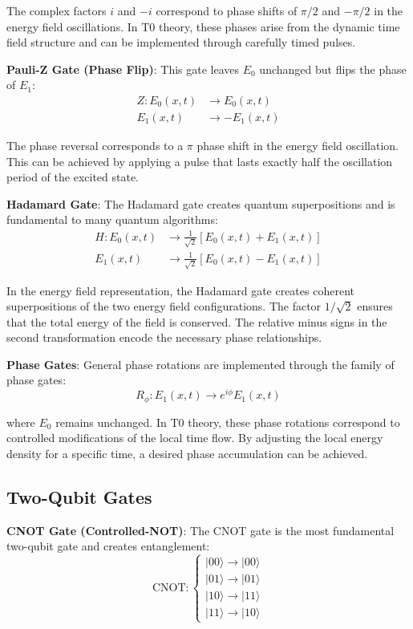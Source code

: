 \documentclass[12pt,a4paper]{article}
\theoremstyle{definition}
\theoremstyle{remark}
\begin{document}
	The complex factors $i$ and $-i$ correspond to phase shifts of $\pi/2$ and $-\pi/2$ in the energy field oscillations. In T0 theory, these phases arise from the dynamic time field structure and can be implemented through carefully timed pulses.
	
	\textbf{Pauli-Z Gate (Phase Flip)}:
	This gate leaves $E_0$ unchanged but flips the phase of $E_1$:
	\begin{align}
		Z: E_0(x,t) &\rightarrow E_0(x,t) \\
		E_1(x,t) &\rightarrow -E_1(x,t)
	\end{align}
	
	The phase reversal corresponds to a $\pi$ phase shift in the energy field oscillation. This can be achieved by applying a pulse that lasts exactly half the oscillation period of the excited state.
	
	\textbf{Hadamard Gate}:
	The Hadamard gate creates quantum superpositions and is fundamental to many quantum algorithms:
	\begin{align}
		H: E_0(x,t) &\rightarrow \frac{1}{\sqrt{2}}[E_0(x,t) + E_1(x,t)] \\
		E_1(x,t) &\rightarrow \frac{1}{\sqrt{2}}[E_0(x,t) - E_1(x,t)]
	\end{align}
	
	In the energy field representation, the Hadamard gate creates coherent superpositions of the two energy field configurations. The factor $1/\sqrt{2}$ ensures that the total energy of the field is conserved. The relative minus signs in the second transformation encode the necessary phase relationships.
	
	\textbf{Phase Gates}:
	General phase rotations are implemented through the family of phase gates:
	\begin{equation}
		R_\phi: E_1(x,t) \rightarrow e^{i\phi} E_1(x,t)
	\end{equation}
	
	where $E_0$ remains unchanged. In T0 theory, these phase rotations correspond to controlled modifications of the local time flow. By adjusting the local energy density for a specific time, a desired phase accumulation can be achieved.
	
	\subsection{Two-Qubit Gates}
	
	\textbf{CNOT Gate (Controlled-NOT)}:
	The CNOT gate is the most fundamental two-qubit gate and creates entanglement:
	\begin{equation}
		\text{CNOT}: \begin{cases}
			|00\rangle \rightarrow |00\rangle \\
			|01\rangle \rightarrow |01\rangle \\
			|10\rangle \rightarrow |11\rangle \\
			|11\rangle \rightarrow |10\rangle
		\end{cases}
	\end{equation}
	
\end{document}
